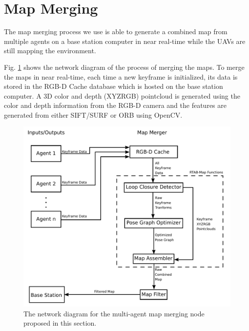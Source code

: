 \documentclass[letterpaper, 10 pt, conference]{ieeeconf}  %
\newcommand{\todo}[1]{{\color{blue}[TODO: #1]}}
\begin{document}
%
%
%
%

\section{Map Merging}\label{merge}

The map merging process we use is able to generate a combined map from multiple agents on a base station computer in near real-time while the UAVs are still mapping the environment.

Fig. \ref{fig:map_merge} shows the network diagram of the process of merging the maps. To merge the maps in near real-time, each time a new keyframe is initialized, its data is stored in the RGB-D Cache database which is hosted on the base station computer. A 3D color and depth (XYZRGB) pointcloud is generated using the color and depth information from the RGB-D camera and the features are generated from either SIFT/SURF or ORB using OpenCV.

\begin{figure}
\centering
\includegraphics[width=0.7\linewidth]{map_merger_network}
\caption{The network diagram for the multi-agent map merging node proposed in this section.}
\label{fig:map_merge}
\end{figure}
\end{document}
